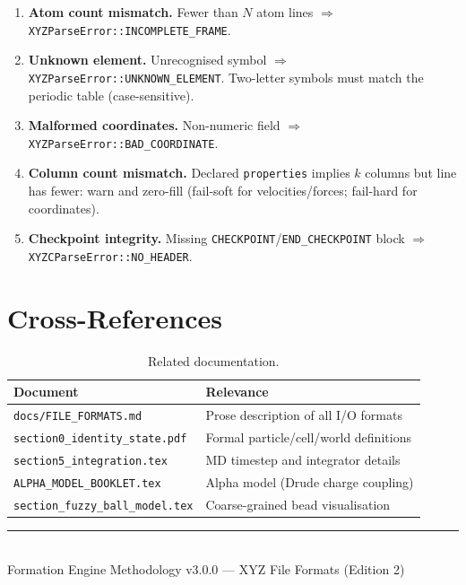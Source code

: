 \documentclass[12pt, a4paper, oneside]{article}
\newcommand{\file}[1]{\texttt{#1}}
\newcommand{\type}[1]{\texttt{#1}}
\begin{document}
\begin{enumerate}
  \item \textbf{Atom count mismatch.}  Fewer than $N$ atom lines
        $\Rightarrow$ \type{XYZParseError::INCOMPLETE\_FRAME}.
  \item \textbf{Unknown element.}  Unrecognised symbol
        $\Rightarrow$ \type{XYZParseError::UNKNOWN\_ELEMENT}.
        Two-letter symbols must match the periodic table (case-sensitive).
  \item \textbf{Malformed coordinates.}  Non-numeric field
        $\Rightarrow$ \type{XYZParseError::BAD\_COORDINATE}.
  \item \textbf{Column count mismatch.}  Declared \texttt{properties}
        implies $k$ columns but line has fewer: warn and zero-fill
        (fail-soft for velocities/forces; fail-hard for coordinates).
  \item \textbf{Checkpoint integrity.}  Missing
        \texttt{CHECKPOINT}/\texttt{END\_CHECKPOINT} block
        $\Rightarrow$ \type{XYZCParseError::NO\_HEADER}.
\end{enumerate}

\section{Cross-References}

\begin{table}[htbp]
  \centering
  \caption{Related documentation.}
  \label{tab:xrefs}
  \begin{tabular}{lp{8cm}}
    \toprule
    Document & Relevance \\
    \midrule
    \file{docs/FILE\_FORMATS.md}              & Prose description of all I/O formats \\
    \file{section0\_identity\_state.pdf}       & Formal particle/cell/world definitions \\
    \file{section5\_integration.tex}           & MD timestep and integrator details \\
    \file{ALPHA\_MODEL\_BOOKLET.tex}           & Alpha model (Drude charge coupling) \\
    \file{section\_fuzzy\_ball\_model.tex}     & Coarse-grained bead visualisation \\
    \bottomrule
  \end{tabular}
\end{table}

\vfill

\begin{center}
\rule{0.5\textwidth}{0.4pt}\\[6pt]
\small Formation Engine Methodology v3.0.0 --- XYZ File Formats (Edition 2)
\end{center}
\end{document}

